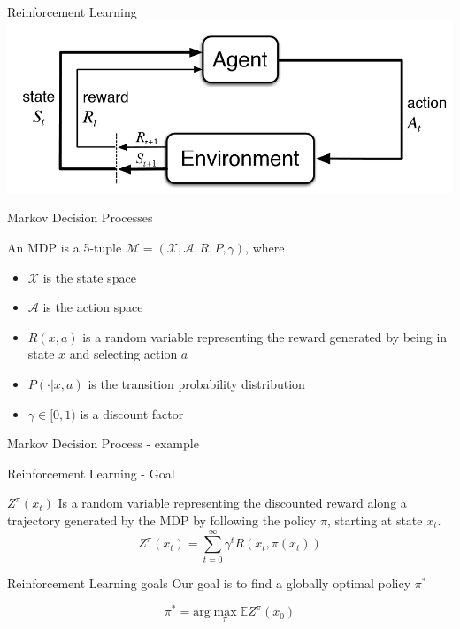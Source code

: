 \documentclass{beamer}
\renewcommand{\exp}{\mathbb{E}}
\begin{document}
\begin{frame}{Reinforcement Learning}
\includegraphics[width=\linewidth]{../gfx/rl_cycle.png}
\end{frame}

\begin{frame}{Markov Decision Processes}

\begin{definition}
An MDP is a 5-tuple $\mathcal{M} = (\mathcal{X}, \mathcal{A}, R, P, \gamma)$, where

\begin{itemize}
\item $\mathcal{X}$ is the state space
\item $\mathcal{A}$ is the action space
\item $R(x, a)$ is a random variable representing the reward generated by being in state $x$ and selecting action $a$
\item $P(\cdot|x, a)$ is the transition probability distribution
\item $\gamma \in [0, 1)$ is a discount factor
\end{itemize}
\end{definition}

\end{frame}

\begin{frame}{Markov Decision Process - example}

\center
{}
\end{frame}

\begin{frame}{Reinforcement Learning - Goal}

\begin{definition}
$Z^\pi(x_t)$ Is a random variable representing the discounted reward along a trajectory generated by the MDP by following the policy $\pi$, starting at state $x_t$.
$$Z^\pi(x_{t})=\sum_{t=0}^\infty \gamma^tR(x_t,\pi(x_t))$$
\end{definition}

\begin{block}{Reinforcement Learning goals}
Our goal is to find a globally optimal policy $\pi^*$

$$\pi^* = \text{arg}\max_\pi \exp Z^\pi(x_0)$$
\end{block}

\end{frame}
\end{document}
